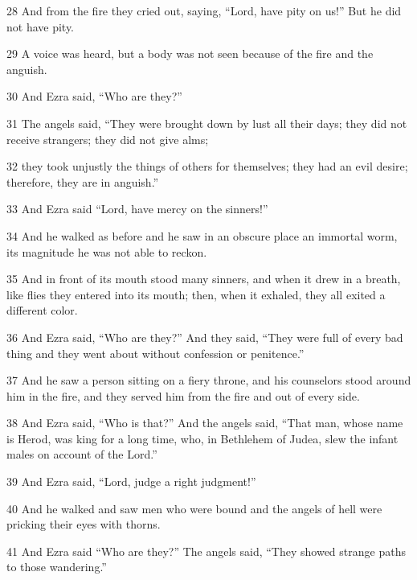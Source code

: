 \par 28 And from the fire they cried out, saying, “Lord, have pity on us!” But he did not have pity.

\par 29 A voice was heard, but a body was not seen because of the fire and the anguish.

\par 30 And Ezra said, “Who are they?” 

\par 31 The angels said, “They were brought down by lust all their days; they did not receive strangers; they did not give alms;

\par 32 they took unjustly the things of others for themselves; they had an evil desire; therefore, they are in anguish.”

\par 33 And Ezra said “Lord, have mercy on the sinners!”

\par 34 And he walked as before and he saw in an obscure place an immortal worm, its magnitude he was not able to reckon.

\par 35 And in front of its mouth stood many sinners, and when it drew in a breath, like flies they entered into its mouth; then, when it exhaled, they all exited a different color.

\par 36 And Ezra said, “Who are they?” And they said, “They were full of every bad thing and they went about without confession or penitence.”

\par 37 And he saw a person sitting on a fiery throne, and his counselors stood around him in the fire, and they served him from the fire and out of every side.

\par 38 And Ezra said, “Who is that?” And the angels said, “That man, whose name is Herod, was king for a long time, who, in Bethlehem of Judea, slew the infant males on account of the Lord.”

\par 39 And Ezra said, “Lord, judge a right judgment!”

\par 40 And he walked and saw men who were bound and the angels of hell were pricking their eyes with thorns.

\par 41 And Ezra said “Who are they?” The angels said, “They showed strange paths to those wandering.”

